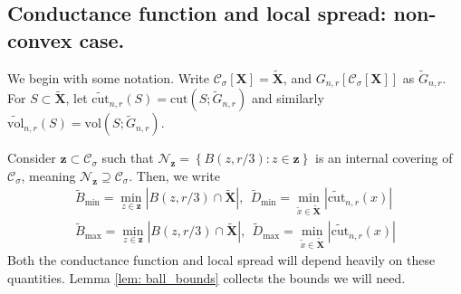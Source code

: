 \documentclass{article}
\newcommand{\set}[1]{\left\{#1\right\}}
\newcommand{\vol}{\mathrm{vol}}
\newcommand{\abs}[1]{\left \lvert #1 \right \rvert}
\newcommand{\1}{\mathbf{1}}
\newcommand{\cut}{\mathrm{cut}}
\newcommand{\zbf}{\mathbf{z}}
\newcommand{\Xbf}{\mathbf{X}}
\newcommand{\Cset}{\mathcal{C}}
\newcommand{\Csig}{\Cset_{\sigma}}
\newcommand{\wX}{\widetilde{\Xbf}}
\newcommand{\wx}{\widetilde{x}}
\theoremstyle{aldenthm}
\begin{document}
\subsection{Conductance function and local spread: non-convex case.}
\label{sec: non_convex_conductance_function_and_local_spread}

We begin with some notation. Write $\Csig[\Xbf] = \wX$, and $G_{n,r}[\Csig[\Xbf]]$ as $\widetilde{G}_{n,r}$. For $S \subset \wX$, let $\widetilde{\cut}_{n,r}(S) = \cut(S;\widetilde{G}_{n,r})$ and similarly $\widetilde{\vol}_{n,r}(S) = \vol(S;\widetilde{G}_{n,r})$. 

Consider $\zbf \subset \Csig$ such that  $\mathcal{N}_{\zbf} = \set{B(z,r/3): z \in \zbf}$ is an internal covering of $\Csig$, meaning $\mathcal{N}_{\zbf} \supseteq \Csig$. Then, we write
\begin{align*}
\widetilde{B}_{\min} = \min_{z \in \zbf} \abs{B(z,r/3) \cap \wX}, ~~
\widetilde{D}_{\min} = \min_{\wx \in \wX} \abs{\widetilde{\cut}_{n,r}(x)} \\ \widetilde{B}_{\max} = \min_{z \in \zbf} \abs{B(z,r/3) \cap \wX}, ~~
\widetilde{D}_{\max} = \min_{\wx \in \wX} \abs{\widetilde{\cut}_{n,r}(x)}
\end{align*}
Both the conductance function and local spread will depend heavily on these quantities. Lemma \ref{lem: ball_bounds} collects the bounds we will need.
\end{document}
